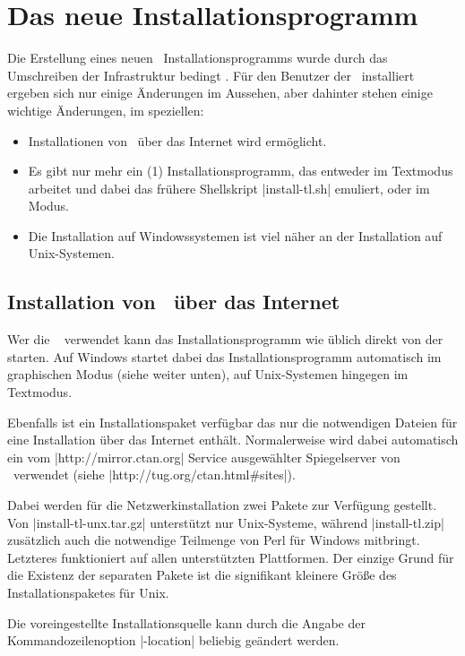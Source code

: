 \section{Das neue Installationsprogramm}
\label{sec:installer}

Die Erstellung eines neuen \tl\ Installationsprogramms wurde durch das
Umschreiben der Infrastruktur bedingt \citep{at:2007-4-069-preining}. 
Für den Benutzer der \tl\ installiert ergeben sich nur einige Änderungen
im Aussehen, aber dahinter stehen einige wichtige Änderungen, im speziellen:
\begin{itemize}
\item Installationen von \tl\ über das Internet wird ermöglicht.
\item Es gibt nur mehr ein (1) Installationsprogramm, das entweder im 
  Textmodus arbeitet und dabei das frühere Shellskript |install-tl.sh|
  emuliert, oder im  Modus.
\item Die Installation auf Windowssystemen ist viel näher an der Installation
  auf Unix-Systemen.
\end{itemize}

\subsection{Installation von  \tl\ über das Internet}

Wer die \tl\  verwendet kann das Installationsprogramm wie 
üblich direkt von der  starten. Auf Windows startet dabei
das Installationsprogramm automatisch im graphischen Modus (siehe weiter 
unten), auf Unix-Systemen hingegen im Textmodus.

Ebenfalls ist ein Installationspaket \citep{inst:package} verfügbar
das nur die notwendigen Dateien für eine Installation über das
Internet enthält. Normalerweise wird dabei automatisch ein vom 
|http://mirror.ctan.org| Service ausgewählter Spiegelserver von \ctan\
verwendet (siehe |http://tug.org/ctan.html#sites|).

Dabei werden für die Netzwerkinstallation zwei Pakete zur Verfügung
gestellt. Von |install-tl-unx.tar.gz| unterstützt nur Unix-Systeme,
während |install-tl.zip| zusätzlich auch die notwendige Teilmenge
von Perl für Windows mitbringt. Letzteres funktioniert auf allen
unterstützten Plattformen. Der einzige Grund für die Existenz der
separaten Pakete ist die signifikant kleinere Größe des Installationspaketes
für Unix.

Die voreingestellte Installationsquelle kann durch die Angabe der 
Kommandozeilenoption |-location| beliebig geändert werden.

